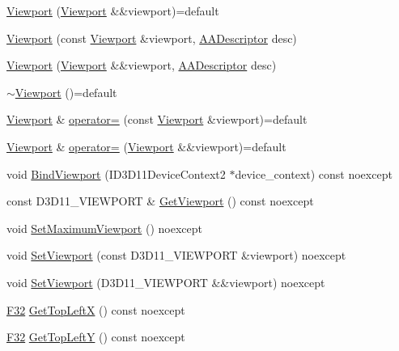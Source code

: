 \begin{DoxyCompactItemize}
\item 
\hyperlink{classmage_1_1_viewport_a314686e3b925a4158418a98ba28c4fc6}{Viewport} (\hyperlink{classmage_1_1_viewport}{Viewport} \&\&viewport)=default
\item 
\hyperlink{classmage_1_1_viewport_a31a85c06722097bf1bc0e6ead39e2e8d}{Viewport} (const \hyperlink{classmage_1_1_viewport}{Viewport} \&viewport, \hyperlink{namespacemage_a86cd40b8f2f42ca4d616cc6ec665a7f2}{A\+A\+Descriptor} desc)
\item 
\hyperlink{classmage_1_1_viewport_a61d8b17ff42b3d78d3b5e9eebff13496}{Viewport} (\hyperlink{classmage_1_1_viewport}{Viewport} \&\&viewport, \hyperlink{namespacemage_a86cd40b8f2f42ca4d616cc6ec665a7f2}{A\+A\+Descriptor} desc)
\item 
\hyperlink{classmage_1_1_viewport_a6fcf68e154b186d5c6241c495cc93fe5}{$\sim$\+Viewport} ()=default
\item 
\hyperlink{classmage_1_1_viewport}{Viewport} \& \hyperlink{classmage_1_1_viewport_ab06320c545dd9b71d17e7f8c92fb693c}{operator=} (const \hyperlink{classmage_1_1_viewport}{Viewport} \&viewport)=default
\item 
\hyperlink{classmage_1_1_viewport}{Viewport} \& \hyperlink{classmage_1_1_viewport_a83ef22f5db0991bc540372d37905524d}{operator=} (\hyperlink{classmage_1_1_viewport}{Viewport} \&\&viewport)=default
\item 
void \hyperlink{classmage_1_1_viewport_a90dc0a655ae756c85085b12c6442b8c3}{Bind\+Viewport} (I\+D3\+D11\+Device\+Context2 $\ast$device\+\_\+context) const noexcept
\item 
const D3\+D11\+\_\+\+V\+I\+E\+W\+P\+O\+RT \& \hyperlink{classmage_1_1_viewport_ad4bb75cdfbd137182898caad913de4d1}{Get\+Viewport} () const noexcept
\item 
void \hyperlink{classmage_1_1_viewport_a5af006b8ec0464a924c3822265727ee2}{Set\+Maximum\+Viewport} () noexcept
\item 
void \hyperlink{classmage_1_1_viewport_a12a0d7b74ce81786e38f08d399acafc6}{Set\+Viewport} (const D3\+D11\+\_\+\+V\+I\+E\+W\+P\+O\+RT \&viewport) noexcept
\item 
void \hyperlink{classmage_1_1_viewport_a12c41f937452bb1897558f0126947b22}{Set\+Viewport} (D3\+D11\+\_\+\+V\+I\+E\+W\+P\+O\+RT \&\&viewport) noexcept
\item 
\hyperlink{namespacemage_aa97e833b45f06d60a0a9c4fc22ae02c0}{F32} \hyperlink{classmage_1_1_viewport_a8ca949f032906839c8cf4ab6018bb2ba}{Get\+Top\+LeftX} () const noexcept
\item 
\hyperlink{namespacemage_aa97e833b45f06d60a0a9c4fc22ae02c0}{F32} \hyperlink{classmage_1_1_viewport_a9d1ddb340c775c3652c816c551653d69}{Get\+Top\+LeftY} () const noexcept

\end{DoxyCompactItemize}

